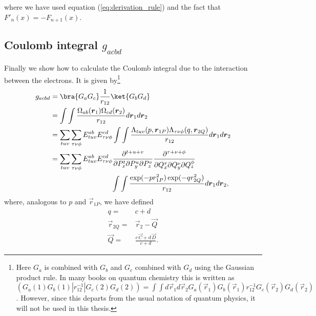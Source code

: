 where we have used equation (\ref{eq:derivation_rule}) and the fact that $F'_n(x) = -F_{n+1}(x)$.


\subsection{Coulomb integral $g_{acbd}$}
\label{sec:g_abcd}
Finally we show how to calculate the Coulomb integral due to the interaction between the electrons. It is given by\footnote{Here $G_a$ is combined with $G_b$ and $G_c$ combined with
$G_d$ using the Gaussian product rule. In many books on quantum chemistry this is written as \newline
$\left(G_a(1) G_b(1)|r^{-1}_{12}|G_c(2) G_d(2)\right) =\int\int d\vec r_1 d\vec r_2 G_a(\vec r_1) G_b(\vec r_1) r^{-1}_{12} G_c(\vec r_2) G_d(\vec r_2)$. However, since this
departs from the usual notation of quantum physics, it will not be used in this thesis.}
\begin{equation}
\begin{split}
  g_{acbd} & = \bra{G_a G_c}\frac{1}{r_{12}}\ket{G_b G_d} \\
           & = \int\int \frac{\Omega_{ab}(\vec r_1)\Omega_{cd}(\vec r_2)}{r_{12}} d\vec r_1 d\vec r_2 \\
           & = \sum_{tuv}\sum_{\tau\nu\phi}E^{ab}_{tuv}E^{cd}_{\tau\nu\phi}\int\int\frac{\Lambda_{tuv}(p,\vec r_{1P})\Lambda_{\tau\nu\phi}(q,\vec r_{2Q})}{r_{12}}d \vec r_1 d\vec r_2 \\
           & = \sum_{tuv}\sum_{\tau\nu\phi}E^{ab}_{tuv}E^{cd}_{\tau\nu\phi}\frac{\partial^{t+u+v}}{\partial P_x^t \partial P_y^u \partial P_z^v}
                \frac{\partial^{\tau+\nu+\phi}}{\partial Q_x^\tau \partial Q_y^\nu \partial Q_z^\phi} \\
           &    \hspace{30mm} \int\int\frac{\exp(-pr^2_{1P})\exp(-qr^2_{2Q})}{r_{12}}d \vec r_1 d\vec r_2,
\end{split}
\end{equation}
where, analogous to $p$ and $\vec r_{1P}$, we have defined 
\begin{equation}
 \begin{split}
    q = & c + d\\
  \vec r_{2Q} = & \vec r_2 - \vec Q \\
  \vec Q = & \frac{c\,\vec C + d\,\vec D}{c + d}.
 \end{split}
\end{equation}
